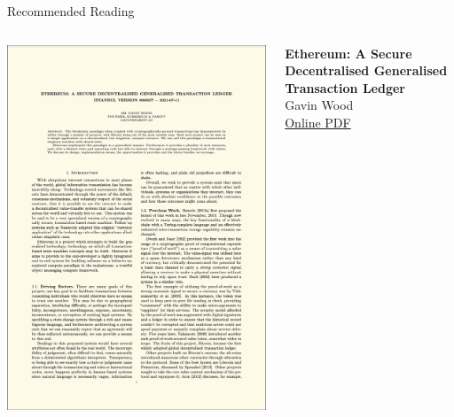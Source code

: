 \documentclass[]{beamer}
\begin{document}
\begin{frame}{Recommended Reading}
\begin{columns}
	\begin{column}{0.3\textwidth}
	\center
	\includegraphics[width=\textwidth , frame]{../assets/images/yellowpaper_cover.png}
	\end{column}
	\begin{column}{0.7\textwidth}
	\textbf{Ethereum: A Secure Decentralised Generalised Transaction Ledger} \\
	Gavin Wood \\
	\link \href{https://ethereum.github.io/yellowpaper/paper.pdf}{Online PDF}
	\end{column}
\end{columns}
\end{frame}

%	
%	
\end{document}
